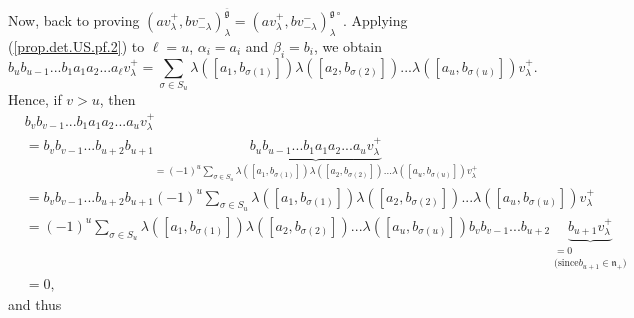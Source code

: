 \documentclass
[numbers=enddot,12pt,final,onecolumn,german,notitlepage]{scrartcl}%
\theoremstyle{definition}
\begin{document}
Now, back to proving $\left(  av_{\lambda}^{+},bv_{-\lambda}^{-}\right)
_{\lambda}^{\overline{\mathfrak{g}}}=\left(  av_{\lambda}^{+},bv_{-\lambda
}^{-}\right)  _{\lambda}^{\mathfrak{g}\circ}$. Applying
(\ref{prop.det.US.pf.2}) to $\ell=u$, $\alpha_{i}=a_{i}$ and $\beta_{i}=b_{i}%
$, we obtain%
\[
b_{u}b_{u-1}...b_{1}a_{1}a_{2}...a_{\ell}v_{\lambda}^{+}=\sum\limits_{\sigma
\in S_{u}}\lambda\left(  \left[  a_{1},b_{\sigma\left(  1\right)  }\right]
\right)  \lambda\left(  \left[  a_{2},b_{\sigma\left(  2\right)  }\right]
\right)  ...\lambda\left(  \left[  a_{u},b_{\sigma\left(  u\right)  }\right]
\right)  v_{\lambda}^{+}.
\]
Hence, if $v>u$, then%
\begin{align*}
&  b_{v}b_{v-1}...b_{1}a_{1}a_{2}...a_{u}v_{\lambda}^{+}\\
&  =b_{v}b_{v-1}...b_{u+2}b_{u+1}\underbrace{b_{u}b_{u-1}...b_{1}a_{1}%
a_{2}...a_{u}v_{\lambda}^{+}}_{=\left(  -1\right)  ^{u}\sum\limits_{\sigma\in
S_{u}}\lambda\left(  \left[  a_{1},b_{\sigma\left(  1\right)  }\right]
\right)  \lambda\left(  \left[  a_{2},b_{\sigma\left(  2\right)  }\right]
\right)  ...\lambda\left(  \left[  a_{u},b_{\sigma\left(  u\right)  }\right]
\right)  v_{\lambda}^{+}}\\
&  =b_{v}b_{v-1}...b_{u+2}b_{u+1}\left(  -1\right)  ^{u}\sum\limits_{\sigma\in
S_{u}}\lambda\left(  \left[  a_{1},b_{\sigma\left(  1\right)  }\right]
\right)  \lambda\left(  \left[  a_{2},b_{\sigma\left(  2\right)  }\right]
\right)  ...\lambda\left(  \left[  a_{u},b_{\sigma\left(  u\right)  }\right]
\right)  v_{\lambda}^{+}\\
&  =\left(  -1\right)  ^{u}\sum\limits_{\sigma\in S_{u}}\lambda\left(  \left[
a_{1},b_{\sigma\left(  1\right)  }\right]  \right)  \lambda\left(  \left[
a_{2},b_{\sigma\left(  2\right)  }\right]  \right)  ...\lambda\left(  \left[
a_{u},b_{\sigma\left(  u\right)  }\right]  \right)  b_{v}b_{v-1}%
...b_{u+2}\underbrace{b_{u+1}v_{\lambda}^{+}}_{\substack{=0\\\text{(since
}b_{u+1}\in\mathfrak{n}_{+}\text{)}}}\\
&  =0,
\end{align*}
and thus%
\end{document}
